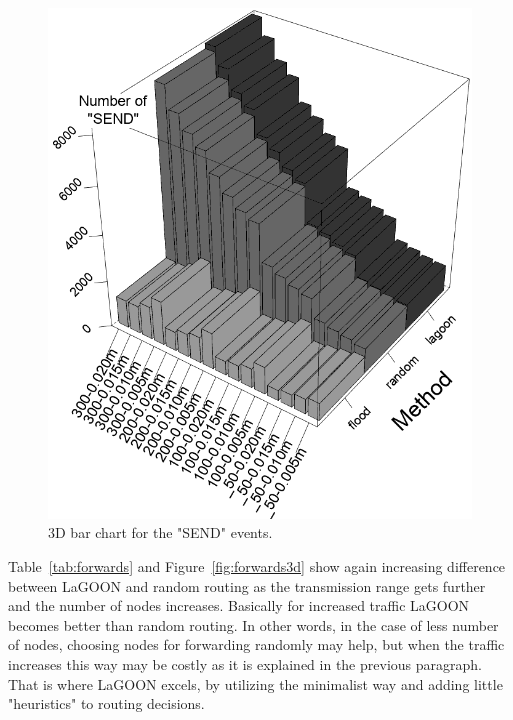 \documentclass[12pt, oneandhalf, chaparabic, sees, ms]{metu}
\begin{document}
\begin{minipage}[t]{0.57\textwidth}
\begin{figure}[H]
\begin{center}
  \includegraphics[width=\textwidth]{3dsends2.png}
   \end{center}
  \caption{3D bar chart for the "SEND" events.}
 \label{fig:sends3d}
\end{figure}
\end{minipage}

\pagebreak

Table~\ref{tab:forwards} and Figure~\ref{fig:forwards3d} show again increasing difference between LaGOON and random 
routing as the transmission range gets further and the number of nodes increases. Basically for increased traffic LaGOON becomes better than random routing.
In other words, in the case of less number of nodes, choosing nodes for forwarding randomly may help, but when the traffic 
increases this way may be costly as it is explained in the previous paragraph. That is where LaGOON excels, by utilizing the minimalist way and adding little "heuristics" to routing decisions.
\end{document}
